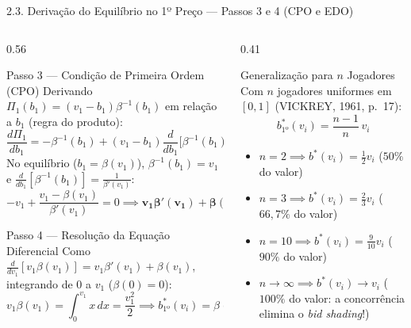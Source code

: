 \documentclass[aspectratio=169, 10pt]{beamer}
\newcommand{\defbox}[2]{%
  \begin{block}{#1}
    \footnotesize\setlength{\abovedisplayskip}{4pt}\setlength{\belowdisplayskip}{4pt}
    #2\par
  \end{block}%
}
\newcommand{\exbox}[2]{%
  \begin{exampleblock}{#1}
    \footnotesize\setlength{\abovedisplayskip}{4pt}\setlength{\belowdisplayskip}{4pt}
    #2\par
  \end{exampleblock}%
}
\begin{document}
\begin{frame}{2.3. Derivação do Equilíbrio no 1º Preço --- Passos 3 e
  4 (CPO e EDO)}
  \begin{columns}[T, onlytextwidth]
    \begin{column}{0.56\textwidth}
      \defbox{Passo 3 --- Condição de Primeira Ordem (CPO)}{%
        Derivando $\Pi_1(b_1) = (v_1 - b_1)\beta^{-1}(b_1)$ em
        relação a $b_1$ (regra do produto):
        \[
          \frac{d\Pi_1}{db_1} = -\beta^{-1}(b_1) + (v_1 -
          b_1)\frac{d}{db_1}\!\big[\beta^{-1}(b_1)\big] = 0
        \]
        No equilíbrio ($b_1 = \beta(v_1)$), $\beta^{-1}(b_1) = v_1$ e
        $\frac{d}{db_1}[\beta^{-1}(b_1)] = \frac{1}{\beta'(v_1)}$:
        \[
          -v_1 + \frac{v_1 - \beta(v_1)}{\beta'(v_1)} = 0 \implies
          \mathbf{v_1 \beta'(v_1) + \beta(v_1) = v_1}
        \]
      }
      \vspace{-0.1cm}
      \defbox{Passo 4 --- Resolução da Equação Diferencial}{%
        Como $\frac{d}{dv_1}[v_1 \beta(v_1)] = v_1 \beta'(v_1) +
        \beta(v_1)$, integrando de $0$ a $v_1$ ($\beta(0)=0$):
        \[
          v_1 \beta(v_1) = \int_0^{v_1} x\,dx = \frac{v_1^2}{2}
          \implies \boxed{b_{\text{1º}}^\ast(v_i) = \beta(v_i) = \frac{v_i}{2}}
        \]
      }
    \end{column}
    \begin{column}{0.41\textwidth}
      \exbox{Generalização para $n$ Jogadores}{%
        Com $n$ jogadores uniformes em $[0,1]$ (VICKREY, 1961, p.\ 17):
        \[
          \boxed{b_{\text{1º}}^\ast(v_i) = \frac{n-1}{n}\,v_i}
        \]
      \begin{itemize}\setlength{\itemsep}{2.5pt}
          \item $n = 2 \implies b^\ast(v_i) = \frac{1}{2}v_i$ ($50\%$ do valor)
          \item $n = 3 \implies b^\ast(v_i) = \frac{2}{3}v_i$
            ($66{,}7\%$ do valor)
          \item $n = 10 \implies b^\ast(v_i) = \frac{9}{10}v_i$
            ($90\%$ do valor)
          \item $n \to \infty \implies b^\ast(v_i) \to v_i$ ($100\%$
            do valor: a concorrência elimina o \textit{bid shading}!)
        \end{itemize}
      }
    \end{column}
  \end{columns}
\end{frame}
\end{document}
